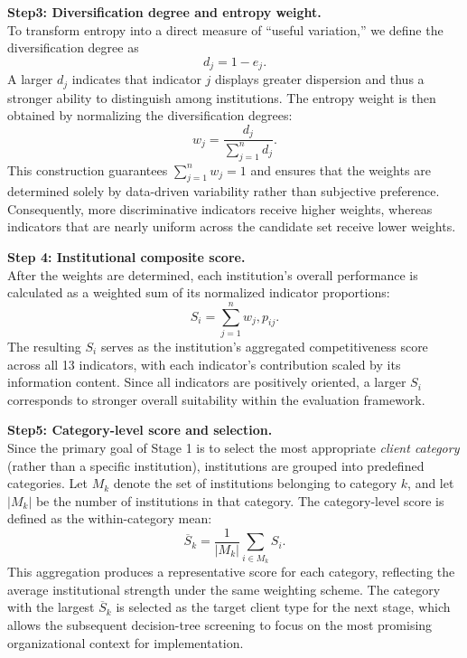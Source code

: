 \documentclass{mcmthesis}
\begin{document}
\vspace{0.5\baselineskip}
\textbf{Step3: Diversification degree and entropy weight.}\\
To transform entropy into a direct measure of “useful variation,” we define the diversification degree as \begin{equation} d_j = 1 - e_j. \end{equation} A larger $d_j$ indicates that indicator $j$ displays greater dispersion and thus a stronger ability to distinguish among institutions. The entropy weight is then obtained by normalizing the diversification degrees: \begin{equation} w_j = \frac{d_j}{\sum_{j=1}^{n} d_j}. \end{equation} This construction guarantees $\sum_{j=1}^{n} w_j = 1$ and ensures that the weights are determined solely by data-driven variability rather than subjective preference. Consequently, more discriminative indicators receive higher weights, whereas indicators that are nearly uniform across the candidate set receive lower weights.

\vspace{0.5\baselineskip}
\textbf{Step 4: Institutional composite score.}\\
 After the weights are determined, each institution’s overall performance is calculated as a weighted sum of its normalized indicator proportions: \begin{equation} S_i = \sum_{j=1}^{n} w_j , p_{ij}. \end{equation} The resulting $S_i$ serves as the institution’s aggregated competitiveness score across all 13 indicators, with each indicator’s contribution scaled by its information content. Since all indicators are positively oriented, a larger $S_i$ corresponds to stronger overall suitability within the evaluation framework.

\vspace{0.5\baselineskip}
\textbf{Step5: Category-level score and selection.}\\
Since the primary goal of Stage 1 is to select the most appropriate \emph{client category} (rather than a specific institution), institutions are grouped into predefined categories. Let $M_k$ denote the set of institutions belonging to category $k$, and let $|M_k|$ be the number of institutions in that category. The category-level score is defined as the within-category mean:
\begin{equation}
\overline{S}_k=\frac{1}{|M_k|}\sum_{i\in M_k} S_i.
\end{equation}
This aggregation produces a representative score for each category, reflecting the average institutional strength under the same weighting scheme. The category with the largest $\overline{S}_k$ is selected as the target client type for the next stage, which allows the subsequent decision-tree screening to focus on the most promising organizational context for implementation.
\end{document}

